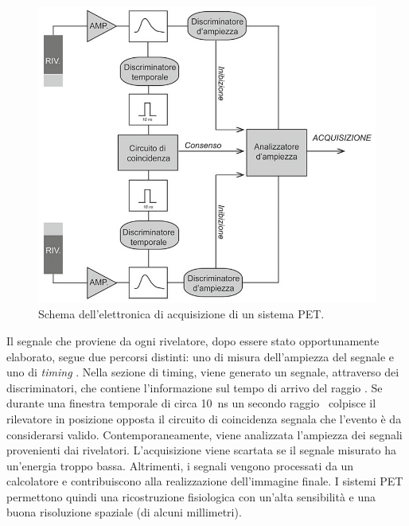 \begin{figure}[tbh]
	\centering
	\includegraphics[width=0.6\linewidth]{./ImageFiles/circuito pet.jpg}
	\caption{Schema dell'elettronica di acquisizione di un sistema PET\cite{Volterrani2010}.}
	\label{fig:pet_circuit}
\end{figure} 
Il segnale che proviene da ogni rivelatore, dopo essere stato opportunamente elaborato, segue due percorsi distinti: uno di misura dell'ampiezza del segnale e uno di \textit{timing} \cite{Volterrani2010}. Nella sezione di timing, viene generato un segnale, attraverso dei discriminatori, che contiene l'informazione sul tempo di arrivo del raggio \textgamma. Se durante una finestra temporale di circa \SI{10}{\nano\second} un secondo raggio \textgamma\ colpisce il rilevatore in posizione opposta il circuito di coincidenza segnala che l'evento è da considerarsi valido. Contemporaneamente, viene analizzata l'ampiezza dei segnali provenienti dai rivelatori. L'acquisizione viene scartata se il segnale misurato ha un'energia troppo bassa. Altrimenti, i segnali vengono processati da un calcolatore e contribuiscono alla realizzazione dell'immagine finale. I sistemi PET permettono quindi una ricostruzione fisiologica con un'alta sensibilità e una buona risoluzione spaziale (di alcuni millimetri).

